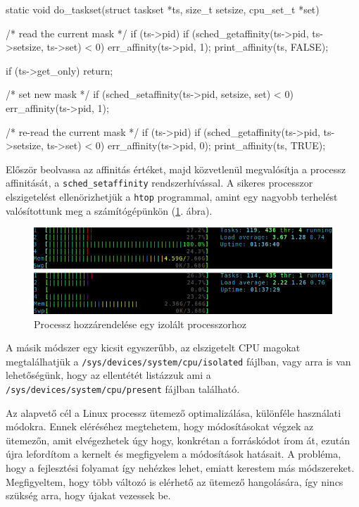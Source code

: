 \begin{cpp}
static void do_taskset(struct taskset *ts, size_t setsize, 
                       cpu_set_t *set){
    /* read the current mask */
    if (ts->pid) {
        if (sched_getaffinity(ts->pid, ts->setsize, ts->set) < 0)
            err_affinity(ts->pid, 1);
        print_affinity(ts, FALSE);
    }

    if (ts->get_only)
        return;

    /* set new mask */
    if (sched_setaffinity(ts->pid, setsize, set) < 0)
        err_affinity(ts->pid, 1);

    /* re-read the current mask */
    if (ts->pid) {
        if (sched_getaffinity(ts->pid, ts->setsize, ts->set) < 0)
            err_affinity(ts->pid, 0);
        print_affinity(ts, TRUE);
    }
}
\end{cpp}

Először beolvassa az affinitás értéket, majd közvetlenül megvalósítja a processz affinitását, a \texttt{sched\_setaffinity} rendszerhívással.
A sikeres processzor elszigetelést ellenörizhetjük a \texttt{htop} programmal, amint egy nagyobb terhelést valósítottunk meg a számítógépünkön (\ref{fig:taskset}. ábra).

\begin{figure}[h!]
\centering
\includegraphics[width=\textwidth]{images/tasksetHtop.png}
\caption{Processz hozzárendelése egy izolált processzorhoz}
\label{fig:taskset}
\end{figure}

A másik módszer egy kicsit egyszerűbb, az elszigetelt CPU magokat megtalálhatjük a \texttt{/sys/devices/system/cpu/isolated} fájlban, vagy arra is van lehetőségünk, hogy az ellentétét listázzuk ami a \texttt{/sys/devices/system/cpu/present} fájlban található.

Az alapvető cél a Linux processz ütemező optimalizálása, különféle használati módokra.
Ennek eléréséhez megtehetem, hogy módosításokat végzek az ütemezőn, amit elvégezhetek úgy hogy, konkrétan a forráskódot írom át, ezután újra lefordítom a kernelt és megfigyelem a módosítások hatásait.
A probléma, hogy a fejlesztési folyamat így nehézkes lehet, emiatt kerestem más módszereket.
Megfigyeltem, hogy több változó is elérhető az ütemező hangolására, így nincs szükség arra, hogy újakat vezessek be.

